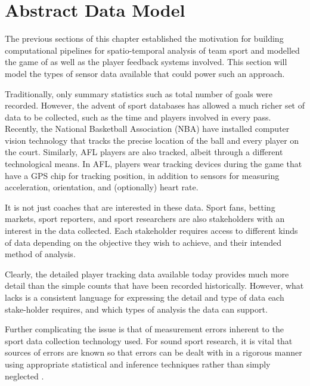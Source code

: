 \section{Abstract Data Model}\label{motivation}


The previous sections of this chapter established the motivation for building computational pipelines for spatio-temporal analysis of team sport and modelled the game of \afl{} as well as the player feedback systems involved. This section will model the types of sensor data available that could power such an approach.

Traditionally, only summary statistics such as total number of goals were recorded. However, the
advent of sport databases has allowed a much richer set of data to be
collected, such as the time and players involved in every pass.
Recently, the National Basketball Association (NBA) have installed
computer vision technology that tracks the precise location of the ball
and every player on the court. Similarly, AFL players are also tracked, albeit through a different technological means. In AFL, players wear tracking devices during the game that have a
GPS chip for tracking position, in addition to sensors for measuring
acceleration, orientation, and (optionally) heart rate.

It is not just coaches that are interested in these data. Sport fans,
betting markets, sport reporters, and sport researchers are also
stakeholders with an interest in the data collected. Each stakeholder
requires access to different kinds of data depending on the objective
they wish to achieve, and their intended method of analysis.

Clearly, the detailed player tracking data available today provides much
more detail than the simple counts that have been recorded historically.
However, what lacks is a consistent language for expressing the detail
and type of data each stake-holder requires, and which types of analysis
the data can support.

Further complicating the issue is that of measurement errors inherent to
the sport data collection technology used. For sound sport research,
it is vital that sources of errors are known so that errors can be dealt
with in a rigorous manner using appropriate statistical and inference
techniques rather than simply neglected \cite{Hughes2004}.

